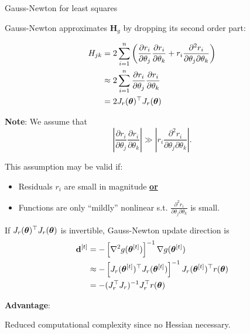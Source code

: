 \documentclass[11pt,compress,t,notes=noshow, xcolor=table]{beamer}
\begin{document}
\begin{vbframe}{Gauss-Newton for least squares}

Gauss-Newton approximates $\mathbf{H}_g$ by dropping its second order part:

\begin{align*}
    H_{jk} &= 2 \sum_{i=1}^n \left(\frac{\partial r_i}{\partial \theta_j}\frac{\partial r_i}{\partial \theta_k} + r_i \frac{\partial^2 r_i}{\partial \theta_j \partial \theta_k}\right) \\
    &\approx  2 \sum_{i=1}^n \frac{\partial r_i}{\partial \theta_j}\frac{\partial r_i}{\partial \theta_k} \\
    &= 2 J_r(\bm{\theta})^\top J_r(\bm{\theta})
\end{align*}

\textbf{Note}: We assume that
\begin{equation*}
    \left|\frac{\partial r_i}{\partial \theta_j}\frac{\partial r_i}{\partial \theta_k}\right| \gg \left|r_i \frac{\partial^2 r_i}{\partial \theta_j \partial \theta_k}\right|.
\end{equation*}

This assumption may be valid if: 

\begin{itemize}
	\item Residuals $r_i$ are small in magnitude \underline{\textbf{or}}
	\item Functions are only \enquote{mildly} nonlinear s.t. $\frac{\partial^2 r_i}{\partial \theta_j \partial \theta_k}$ is small. 
\end{itemize}

\framebreak 

If $J_r(\bm{\theta})^\top J_r(\bm{\theta})$ is invertible, Gauss-Newton update direction is
\begin{align*}
    \mathbf{d}^{[t]} &= - \left[\nabla^2 g(\bm{\theta}^{[t]})\right]^{-1} \nabla g(\bm{\theta}^{[t]}) \\
    &\approx - \left[J_r(\bm{\theta}^{[t]})^\top J_r(\bm{\theta}^{[t]})\right]^{-1} J_r(\bm{\theta}^{[t]})^\top r(\bm{\theta}) \\
    &= - (J_r^\top J_r)^{-1} J_r^\top r(\bm{\theta})
\end{align*}

\textbf{Advantage}:
\vspace{-0.5\baselineskip}
\begin{framed}
    Reduced computational complexity since no Hessian necessary.
\end{framed}


\end{vbframe}
\end{document}
